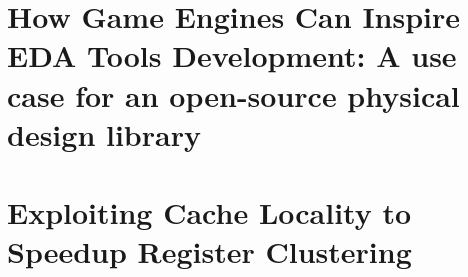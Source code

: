 \documentclass{ufscThesis}
\begin{document}
\apendice


\chapter[Artigo ISPD 2017]{How Game Engines Can Inspire EDA Tools Development: A use case for an open-source physical design library}
\label{ap:artigo_ISPD}


\chapter[Artigo SBCCI 2017]{Exploiting Cache Locality to Speedup Register Clustering}
\label{ap:artigo_SBCCI}





\label{ap:producoes}
\end{document}
